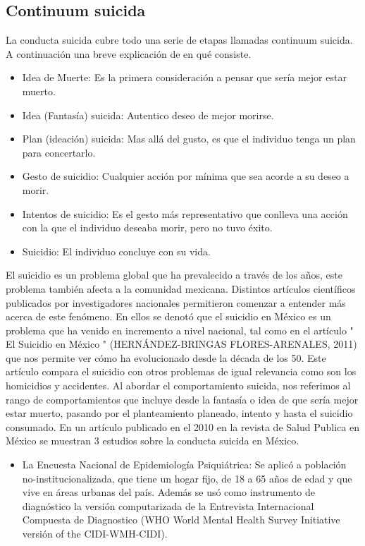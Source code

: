 {\subsection{Continuum suicida}
{
La conducta suicida cubre todo una serie de etapas llamadas continuum suicida. A continuación una breve explicación de en qué consiste.
\begin{itemize}
\item Idea de Muerte: Es la primera consideración a pensar que sería mejor estar muerto.
\item Idea (Fantasía) suicida: Autentico deseo de mejor morirse.
\item Plan (ideación) suicida: Mas allá del gusto, es que el individuo tenga un plan para concertarlo.
\item Gesto de suicidio: Cualquier acción por mínima que sea acorde a su deseo a morir.
\item Intentos de suicidio: Es el gesto más representativo que conlleva una acción con la que el individuo deseaba morir, pero no tuvo éxito.
\item Suicidio: El individuo concluye con su vida.
\end{itemize}
}
El suicidio es un problema global que ha prevalecido a través de los años, este problema también afecta a la comunidad mexicana. Distintos artículos científicos publicados por investigadores nacionales permitieron comenzar a entender más acerca de este fenómeno. En ellos se denotó que el suicidio en México es un problema que ha venido en incremento a nivel nacional, tal como en el artículo " El Suicidio en México " (HERNÁNDEZ-BRINGAS FLORES-ARENALES, 2011) que nos permite ver cómo ha evolucionado desde la década de los 50. Este artículo compara el suicidio con otros problemas de igual relevancia como son los homicidios y accidentes.
\linebreak
\linebreak
Al abordar el comportamiento suicida, nos referimos al rango de comportamientos que incluye desde la fantasía o idea de que sería mejor estar muerto, pasando por el planteamiento planeado, intento y hasta el suicidio consumado. En un artículo publicado en el 2010 en la revista de Salud Publica en México se muestran 3 estudios sobre la conducta suicida en México.
\begin{itemize}
\item La Encuesta Nacional de Epidemiología Psiquiátrica: Se aplicó a población no-institucionalizada, que tiene un hogar fijo, de 18 a 65 años de edad y que vive en áreas urbanas del país. Además se usó como instrumento de diagnóstico la versión computarizada de la Entrevista Internacional Compuesta de Diagnostico (WHO World Mental Health Survey Initiative versión of the CIDI-WMH-CIDI).

\end{itemize}}
